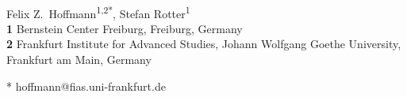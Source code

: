 \begin{flushleft}
{\Large
\textbf{} %
}
\newline
\\
Felix Z.~Hoffmann\textsuperscript{1,2*},
Stefan Rotter\textsuperscript{1}
\\
\bigskip
\textbf{1} Bernstein Center Freiburg, Freiburg, Germany
\\
\textbf{2} Frankfurt Institute for Advanced Studies, Johann Wolfgang Goethe University, Frankfurt am Main, Germany
\\
\bigskip

% 

* hoffmann@fias.uni-frankfurt.de

\end{flushleft}
